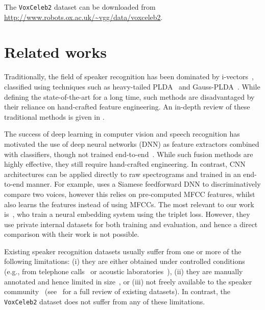 \documentclass[a4paper]{article}
\begin{document}
\vspace{10pt}
The \texttt{VoxCeleb2} dataset
 can be downloaded from \url{http://www.robots.ox.ac.uk/~vgg/data/voxceleb2}.
 
\section{Related works}

Traditionally, the field of speaker recognition has been dominated by
i-vectors~\cite{dehak2011front}, classified using techniques such as
heavy-tailed PLDA~\cite{matvejka2011full} and
Gauss-PLDA~\cite{cumani2013probabilistic}. While defining  the
state-of-the-art for a long time, such methods are disadvantaged by
their reliance on hand-crafted feature engineering. An in-depth
review of these traditional methods is given in \cite{hansen2015speaker}.

The success of deep learning in computer vision and speech
recognition has motivated the use of deep neural networks (DNN) as
feature extractors combined with classifiers, though not trained end-to-end~\cite{variani2014deep,lei2014novel,ghalehjegh2015deep,snyder2017deep,snyder2018x}.
While such fusion methods are highly effective, they still require
hand-crafted engineering. In contrast, CNN architectures can be applied directly to raw
spectrograms and trained in an end-to-end manner. 
For example,
\cite{Chen11} uses a Siamese feedforward DNN to
discriminatively compare two voices, however this relies on
pre-computed MFCC features, whilst~\cite{Yella14} also learns the features instead of using MFCCs. 
The most relevant to our work is~\cite{li2017deep}, who train a neural embedding system using the triplet loss. However, they use private internal datasets for both training and evaluation, and hence a direct comparison with their work is not possible. 


Existing speaker recognition datasets usually suffer from one or more
of the following limitations: (i) they are either obtained under
controlled conditions (e.g.,  from telephone
calls~\cite{vannfi,Hennebert00} or acoustic
laboratories~\cite{Millar94,Garofolo93,Fisher86}), (ii) they are
manually annotated and hence limited in size~\cite{Mclaren16}, or
(iii) not freely available to the speaker
community~\cite{greenberg2012nist,Fisher86}  (see~\cite{Nagrani17} for
a full review of existing datasets). In contrast, the
\texttt{VoxCeleb2} dataset does not suffer from any of these limitations.
\end{document}
